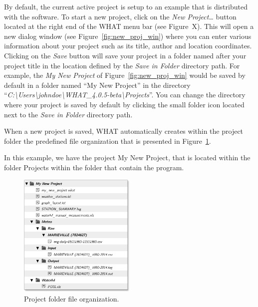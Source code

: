 \documentclass[12pt, letterpaper, fleqn]{report}
\begin{document}
By default, the current active project is setup to an example that is distributed with the software. To start a new project, click on the \textsl{New Project\dots} button located at the right end of the WHAT menu bar (see Figure~X). This will open a new dialog window (see Figure~\ref{fig:new_proj_win}) where you can enter various information about your project such as its title, author and location coordinates. Clicking on the \textsl{Save} button will save your project in a folder named after your project title in the location defined by the \textsl{Save in Folder} directory path. For example, the \textsl{My New Project} of Figure~\ref{fig:new_proj_win} would be saved by default in a folder named ``My New Project'' in the directory ``\textsl{C:\textbackslash{}Users\textbackslash{}johndoe\textbackslash{}WHAT\_4.0.5-beta\textbackslash{}Projects}''. You can change the directory where your project is saved by default by clicking the small folder icon located next to the \textsl{Save in Folder} directory path.



When a new project is saved, WHAT automatically creates within the project folder the predefined file organization that is presented in Figure~\ref{fig:proFolder_organization}.

In this example, we have the project My New Project, that is located within the folder Projects within the folder that contain the program.

\begin{figure}[h!]
\centering
\includegraphics[width=0.5\textwidth]{file_and_folder_architecture}
\caption[Project folder file organization.]{Project folder file organization.}
\label{fig:proFolder_organization}
\end{figure}
\end{document}
